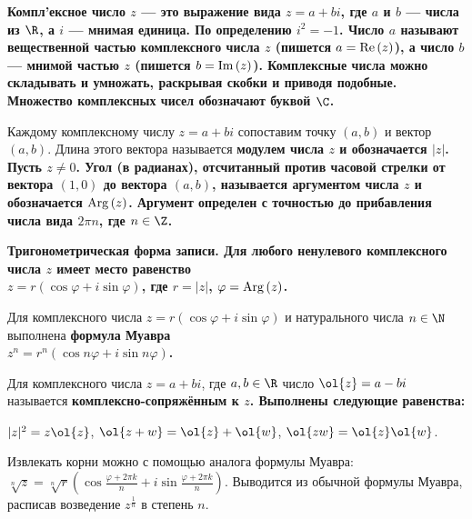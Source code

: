 \begin{solution}
\bf{Компл'ексное число} \(z\) --- это выражение вида \(z=a+bi\), где \(a\) и \(b\) --- числа из \(\R\), а \(i\) --- \bf{мнимая единица}. По определению \(i^2=-1\).
Число \(a\) называют \bf{вещественной частью} комплексного числа \(z\) (пишется \(a={\rm Re}\,(z)\)), а число \(b\) --- \bf{мнимой частью} \(z\) (пишется \(b={\rm Im}\,(z)\)).
Комплексные числа можно складывать и умножать, \lgq раскрывая скобки и приводя подобные\rgq. Множество комплексных чисел обозначают буквой \(\C\).

Каждому комплексному числу \(z=a+bi\) сопоставим точку \((a,b)\) и вектор \((a,b)\). Длина этого вектора называется \bf{модулем} числа \(z\) и обозначается \(|z|\). Пусть \(z\ne0\).
Угол (в радианах), отсчитанный против часовой стрелки от вектора \((1,0)\) до вектора \((a,b)\), называется \bf{аргументом} числа \(z\) и обозначается \({\rm Arg}\,(z)\). Аргумент определен с точностью до прибавления числа вида \(2\pi n\), где \(n\in\Z\).

\bf{Тригонометрическая форма записи.} Для любого ненулевого комплексного числа \(z\) имеет место равенство\\ \(z=r (\cos \varphi +i\sin \varphi )\), где \(r=|z|\), \(\varphi={\rm Arg}\,(z)\).

Для комплексного числа \(z=r(\cos\varphi+i\sin\varphi)\) и натурального числа \(n\in\N\) выполнена \bf{формула Муавра}\\
\(z^n=r^n(\cos n\varphi+i\sin n\varphi)\).

Для комплексного числа \(z=a+bi\), где \(a,b\in \R\) число \(\ol{z}=a-bi\) называется \bf{комплексно-сопряжённым} к \(z\). Выполнены следующие равенства:

\(|z|^2=z\ol{z}\), \(\ol{z+w} = \ol{z} + \ol{w}\), \(\ol{zw}= \ol{z}\ol{w}\).

Извлекать корни можно с помощью аналога формулы Муавра: $\sqrt[n]{z}=\sqrt[n]{r}(\cos \frac{\varphi+2\pi k}{n}+i\sin \frac{\varphi+2\pi k}{n})$. Выводится из обычной формулы Муавра, расписав возведение $z^{\frac{1}{n}}$ в степень $n$.
\end{solution}

